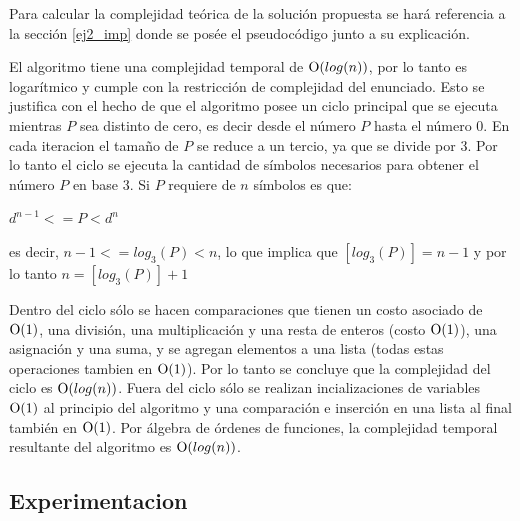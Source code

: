 	Para calcular la complejidad teórica de la solución propuesta se hará
	referencia a la sección \ref{ej2_imp} donde se posée el pseudocódigo junto a
	su explicación.

	El algoritmo tiene una complejidad temporal de $\operatorname{O}(log(n))$, por lo tanto es
	logarítmico y cumple con la restricción de complejidad del enunciado. Esto se justifica con el hecho de que el algoritmo posee un ciclo
	principal que se ejecuta mientras $P$ sea distinto de cero, es decir desde el número $P$ hasta el número 0. En cada iteracion el tamaño de $P$ se reduce a un tercio, ya que se divide por 3. Por lo tanto el ciclo se ejecuta la cantidad de símbolos necesarios para obtener el número $P$ en base 3. Si $P$ requiere de $n$ símbolos es que:

	\newline
	$d^{n-1} <= P < d^n$

	\newline
	es decir, $n -1 <= log_3(P) < n$, lo que implica que $[log_3(P)] = n - 1$ y por lo tanto $n = [log_3(P)] + 1$


	Dentro del ciclo sólo se hacen comparaciones que tienen un costo asociado de $\operatorname{O}(1)$, una división, una multiplicación y una resta de enteros (costo $\operatorname{O}(1)$), una asignación y una suma, y se agregan elementos a una lista (todas estas operaciones tambien en $\operatorname{O}(1)$). Por lo tanto se concluye que la complejidad del ciclo es $\operatorname{O}(log(n))$. Fuera del ciclo sólo se realizan incializaciones de variables $\operatorname{O}(1)$ al principio del algoritmo y una comparación e inserción en una lista al final también en $\operatorname{O}(1)$. Por álgebra de órdenes de funciones, la complejidad temporal resultante del algoritmo es $\operatorname{O}(log(n))$. 


    \subsection{Experimentacion}
         

